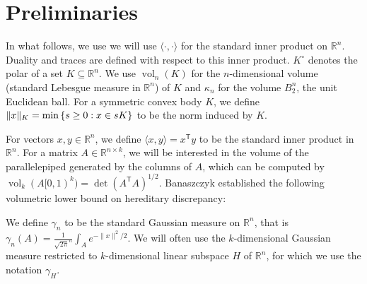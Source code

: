 \documentclass[11pt]{article}
\newcommand{\R}{{\mathbb{R}}}
\newcommand{\T}{\mathsf T}
\newcommand{\eqdef}{\triangleq}
\newcommand{\inner}[2]{\langle #1, #2 \rangle}
\newcommand{\set}[1]{\left\{ #1 \right\}}
\DeclareMathOperator{\vollb}{volLB}
\DeclareMathOperator{\vol}{vol}
\DeclareMathOperator{\lspan}{span}
\DeclarePairedDelimiter\norm{\lVert}{\rVert}
\begin{document}


\section{Preliminaries}
\label{sec:prelims}

In what follows, we use we will use $\inner{\cdot}{\cdot}$ for the standard
inner product on $\R^n$. Duality and traces are defined with respect to this
inner product. $K^\circ$ denotes the polar of a set $K \subseteq \R^n$. We use
$\vol_n(K)$ for the $n$-dimensional volume (standard Lebesgue measure in $\R^n$)
of $K$ and $\kappa_n$ for the volume $B_2^n$, the unit Euclidean ball. For a
symmetric convex body $K$, we define $\norm{x}_K = \min \set{s \geq 0: x \in sK}$
to be the norm induced by $K$.


For vectors $x,y \in \R^n$, we define $\inner{x}{y} = x^\T y$ to be the standard
inner product in $\R^n$. For a matrix $A \in \R^{n \times k}$, we will be
interested in the volume of the parallelepiped generated by the columns of $A$,
which can be computed by $\vol_k(A[0,1)^k) = \det(A^\T A)^{1/2}$. Banaszczyk
established the following volumetric lower bound on hereditary discrepancy:

We define $\gamma_n$ to be the standard Gaussian measure on $\R^n$, that is
$\gamma_n(A) = \frac{1}{\sqrt{2\pi}^n} \int_A e^{-\|x\|^2/2}$. We will often use
the $k$-dimensional Gaussian measure restricted to $k$-dimensional linear
subspace $H$ of $\R^n$, for which we use the notation $\gamma_H$.
\end{document}
